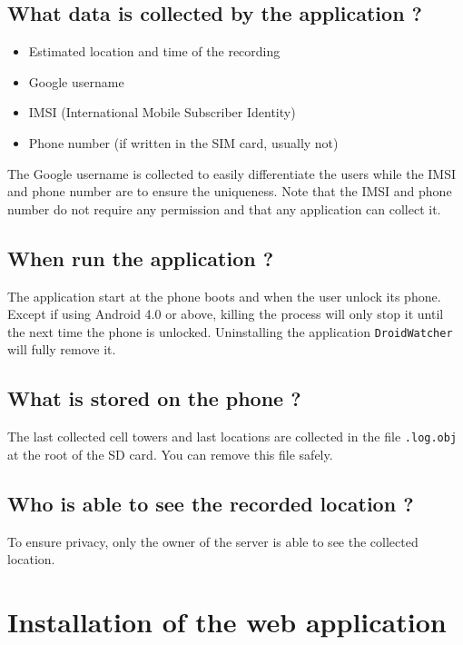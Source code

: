 \subsection{What data is collected by the application ?}

\begin{itemize}
\item Estimated location and time of the recording
\item Google username
\item IMSI (International Mobile Subscriber Identity)
\item Phone number (if written in the SIM card, usually not)
\end{itemize}

The Google username is collected to easily differentiate the users while the IMSI and phone number are to ensure the uniqueness.
Note that the IMSI and phone number do not require any permission and that any application can collect it.

\subsection{When run the application ?}

The application start at the phone boots and when the user unlock its phone.
Except if using Android 4.0 or above, killing the process will only stop it until the next time the phone is unlocked.
Uninstalling the application \texttt{DroidWatcher} will fully remove it.

\subsection{What is stored on the phone ?}

The last collected cell towers and last locations are collected in the file \texttt{.log.obj} at the root of the SD card. You can remove this file safely.

\subsection{Who is able to see the recorded location ?}

To ensure privacy, only the owner of the server is able to see the collected location.


\section{Installation of the web application}
\label{sec:dw-django}

